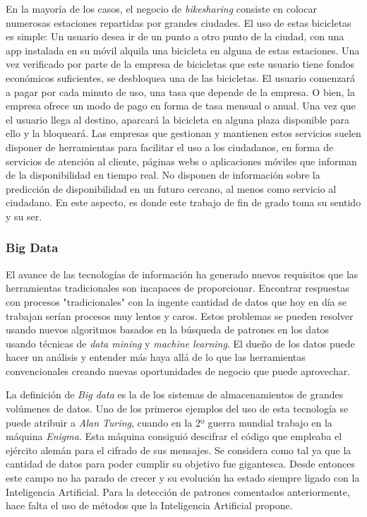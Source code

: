 En la mayoría de los casos, el negocio de \textit{bikesharing} consiste en colocar numerosas estaciones repartidas por grandes ciudades. El uso de estas bicicletas es simple: Un usuario desea ir de un punto a otro punto de la ciudad, con una app instalada en su móvil alquila una bicicleta en alguna de estas estaciones. Una vez verificado por parte de la empresa de bicicletas que este usuario tiene fondos económicos suficientes, se desbloquea una de las bicicletas. El usuario comenzará a pagar por cada minuto de uso, una tasa que depende de la empresa. O bien, la empresa ofrece un modo de pago en forma de tasa mensual o anual. Una vez que el usuario llega al destino, aparcará la bicicleta en alguna plaza disponible para ello y la bloqueará. Las empresas que gestionan y mantienen estos servicios suelen disponer de herramientas para facilitar el uso a los ciudadanos, en forma de servicios de atención al cliente, páginas webs o aplicaciones móviles que informan de la disponibilidad en tiempo real. No disponen de información sobre la predicción de disponibilidad en un futuro cercano, al menos como servicio al ciudadano. En este aspecto, es donde este trabajo de fin de grado toma su sentido y su ser.
\newline



\subsubsection{Big Data}
El avance de las tecnologías de información ha generado nuevos requisitos que las herramientas tradicionales son incapaces de proporcionar. Encontrar respuestas con procesos "tradicionales" con la ingente cantidad de datos que hoy en día se trabajan serían procesos muy lentos y caros. Estos problemas se pueden resolver usando nuevos algoritmos basados en la búsqueda de patrones en los datos usando técnicas de \textit{data mining} y \textit{machine learning}. El dueño de los datos puede hacer un análisis y entender más haya allá de lo que las herramientas convencionales creando nuevas oportunidades de negocio que puede aprovechar.
\newline

La definición de \textit{Big data} es la de los sistemas de almacenamientos de grandes volúmenes de datos. Uno de los primeros ejemplos del uso de esta tecnología se puede atribuir a \textit{Alan Turing}, cuando en la 2º guerra mundial trabajo en la máquina \textit{Enigma}. Esta máquina consiguió descifrar el código que empleaba el ejército alemán para el cifrado de sus mensajes. Se considera como tal ya que la cantidad de datos para poder cumplir su objetivo fue gigantesca. Desde entonces este campo no ha parado de crecer y su evolución ha estado siempre ligado con la Inteligencia Artificial. Para la detección de patrones comentados anteriormente, hace falta el uso de métodos que la Inteligencia Artificial propone.
\newline

